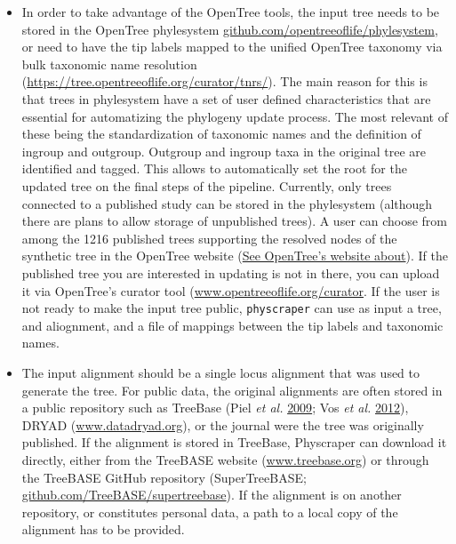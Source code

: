 \documentclass[]{article}
\providecommand{\tightlist}{%
  \setlength{\itemsep}{0pt}\setlength{\parskip}{0pt}}
\begin{document}
\begin{itemize}
\tightlist
\item
  In order to take advantage of the OpenTree tools, the input tree needs to be stored in the
  OpenTree phylesystem \href{https://github.com/opentreeoflife/phylesystem}{github.com/opentreeoflife/phylesystem}, or need to have the tip labels mapped to the unified OpenTree taxonomy via bulk taxonomic name resolution (\url{https://tree.opentreeoflife.org/curator/tnrs/}).
  The main
  reason for this is that trees in phylesystem have a set of user defined characteristics
  that are essential for automatizing the phylogeny update process. The most relevant of these being the standardization of taxonomic names and the definition of ingroup and outgroup. Outgroup and ingroup taxa in the original tree are identified and tagged. This allows to automatically set the root for the updated tree on the final steps of the pipeline.
  Currently, only trees connected to
  a published study can be stored in the phylesystem (although there are plans to
  allow storage of unpublished trees).
  A user can choose from among the 1216 published trees supporting the resolved nodes of the synthetic tree in the OpenTree website (\href{https://tree.opentreeoflife.org/about/synthesis-release/v12.3}{See OpenTree's website about}). If the published tree you are interested in updating is not in there, you can upload it via OpenTree's curator tool (\href{https://tree.opentreeoflife.org/curator}{www.opentreeoflife.org/curator}.
  If the user is not ready to make the input tree public, \texttt{physcraper} can use as input a tree, and aliognment, and a file of mappings between the tip labels and taxonomic names.
\item
  The input alignment should be a single locus alignment that was used to generate the tree. For public data, the original
  alignments are often stored in a public repository such as TreeBase (Piel \emph{et al.} \protect\hyperlink{ref-piel2009treebase}{2009}; Vos \emph{et al.} \protect\hyperlink{ref-vos2012nexml}{2012}),
  DRYAD (\href{http://datadryad.org/}{www.datadryad.org}), or the journal were the tree was originally published.
  If the alignment is stored in TreeBase, Physcraper can download it directly,
  either from the TreeBASE website (\href{https://treebase.org/}{www.treebase.org})
  or through the TreeBASE GitHub repository (SuperTreeBASE; \href{https://github.com/TreeBASE/supertreebase}{github.com/TreeBASE/supertreebase}).
  If the alignment is on another repository, or constitutes personal data, a path to a local copy of the alignment has to be provided.

\end{itemize}
\end{document}
